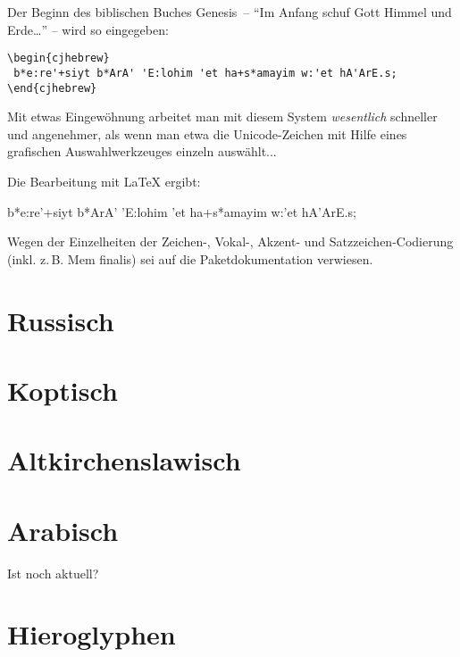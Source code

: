 Der Beginn des biblischen Buches Genesis~-- \enquote{Im Anfang schuf Gott Himmel und Erde\dots} --
wird so eingegeben:

\begin{lstlisting}
\begin{cjhebrew}
 b*e:re'+siyt b*ArA' 'E:lohim 'et ha+s*amayim w:'et hA'ArE.s;
\end{cjhebrew}
\end{lstlisting}

Mit etwas Eingewöhnung arbeitet man mit diesem System \emph{wesentlich} schneller und
angenehmer, als wenn man etwa die Unicode-Zeichen mit Hilfe eines grafischen Auswahlwerkzeuges
einzeln auswählt...

Die Bearbeitung mit \LaTeX{} ergibt:

\begin{cjhebrew}
 b*e:re'+siyt b*ArA' 'E:lohim 'et ha+s*amayim w:'et hA'ArE.s;
\end{cjhebrew}

Wegen der Einzelheiten der Zeichen-, Vokal-, Akzent- und Satzzeichen-Codierung (inkl. z.\,B.
Mem finalis) sei auf die Paketdokumentation verwiesen.

\section{Russisch}

\section{Koptisch}

\section{Altkirchenslawisch}



\section{Arabisch}

Ist  noch aktuell?

\section{Hieroglyphen}

